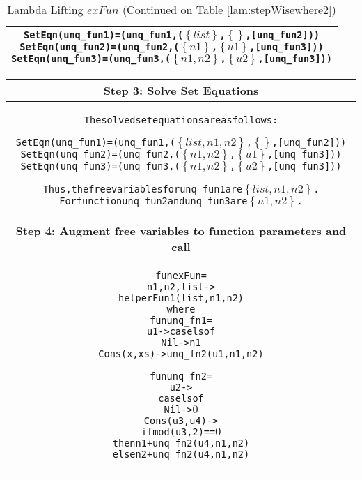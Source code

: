 \documentclass[11pt]{article}
\begin{document}
\begin{table}
\begin{center}
\begin{tabular}{|c|}
\begin{minipage}{4in}
\begin{alltt}
SetEqn(unq_fun1) = (unq_fun1,(\(\left\{list\right\}\),\(\left\{\right\}\),[unq_fun2]))
SetEqn(unq_fun2) = (unq_fun2,(\(\left\{n1\right\}\),\(\left\{u1\right\}\),[unq_fun3]))
SetEqn(unq_fun3) = (unq_fun3,(\(\left\{n1,n2\right\}\),\(\left\{u2\right\}\),[unq_fun3]))

\end{alltt} 
\end {minipage}
\tabularnewline
\hline
\end{tabular}
\caption{Lambda Lifting $exFun$ (Continued on Table \ref {lam:stepWisewhere2})}
\label{lam:stepWisewhere1}
\end{center}
\end{table}


\begin{table}
\begin{center}
\begin{tabular}{|c|} \hline
{\bf Step 3: Solve Set Equations}\\ 
\hline
\begin{minipage}{4in}
\begin{alltt}


The solved set equations are as follows:

SetEqn(unq_fun1) = (unq_fun1,(\(\left\{list,n1,n2\right\}\),\(\left\{\right\}\),[unq_fun2]))
SetEqn(unq_fun2) = (unq_fun2,(\(\left\{n1,n2\right\}\),\(\left\{u1\right\}\),[unq_fun3]))
SetEqn(unq_fun3) = (unq_fun3,(\(\left\{n1,n2\right\}\),\(\left\{u2\right\}\),[unq_fun3]))

Thus, the free variables for unq_fun1 are \(\left\{list,n1,n2\right\}\).
For function unq_fun2 and unq_fun3 are \(\left\{n1,n2\right\}\).

\end{alltt} 
\end {minipage} \\ 
\hline 
{\bf Step 4: Augment free variables to function parameters and call }\\ 
\hline
\begin{minipage}{4in}
\begin{alltt}


  fun exFun = 
    n1,n2,list -> 
        helperFun1 (list,n1,n2)
      where
        fun unq_fn1 = 
          u1 -> case ls of 
                  Nil -> n1
                  Cons(x,xs) -> unq_fn2(u1,n1,n2)

        fun unq_fn2 =
          u2 -> 
            case ls of
              Nil -> \(0\)
              Cons(u3,u4) ->
                if mod(u3,2) == \(0\) 
                  then n1 + unq_fn2(u4,n1,n2)
                  else n2 + unq_fn2(u4,n1,n2) 



\end{alltt}
\end{minipage}
\end{tabular}
\end{center}
\end{table}
\end{document}
